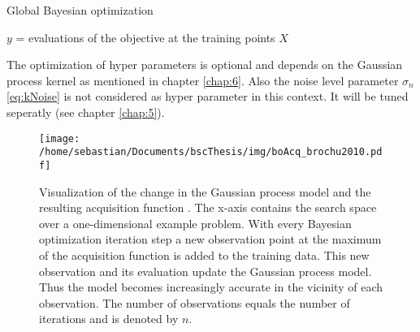 \begin{algorithm}
    \caption{Global Bayesian optimization\label{alg:boGlob}}
    \BlankLine

    $y$ = evaluations of the objective at the training points $X$\\
\end{algorithm}

The optimization of hyper parameters is optional and depends on the Gaussian process kernel as mentioned in chapter \ref{chap:6}. Also the noise level parameter $\sigma_n$ \eqref{eq:kNoise} is not considered as hyper parameter in this context. It will be tuned seperatly (see chapter \ref{chap:5}).

\begin{figure}[h]
    \centering
    \texttt{[image: /home/sebastian/Documents/bscThesis/img/boAcq\_brochu2010.pdf]}
    \caption{Visualization of the change in the Gaussian process model and the resulting acquisition function \cite{brochu2010tutorial}. The x-axis contains the search space over a one-dimensional example problem. With every Bayesian optimization iteration step a new observation point at the maximum of the acquisition function is added to the training data. This new observation and its evaluation update the Gaussian process model. Thus the model becomes increasingly accurate in the vicinity of each observation. The number of observations equals the number of iterations and is denoted by $n$. \label{fig:acqBO}}
\end{figure}

